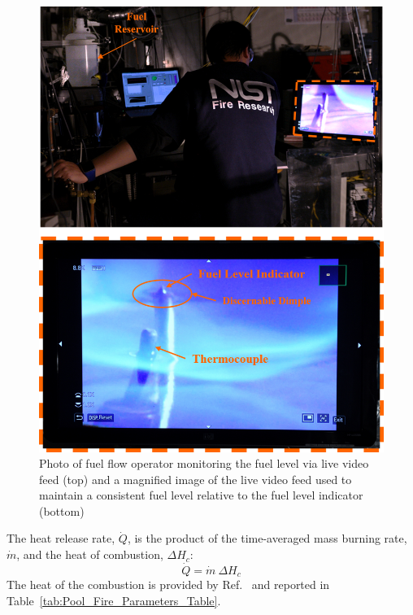 \documentclass[12pt]{article}
\begin{document}
\begin{figure}[h!]
	\centering
\includegraphics[width=14.0cm,keepaspectratio]{Monitoring_Fuel_Level_A.png}
	\caption[Photographs of the fuel monitoring process]{Photo of fuel flow operator monitoring the fuel level via live video feed (top) and a magnified image of the live video feed used to maintain a consistent fuel level relative to the fuel level indicator (bottom)}
	\label{fig:Fuel_Level}
\end{figure}

The heat release rate, $\dot{Q}$, is the product of the time-averaged mass burning rate, $\dot{m}$, and the heat of combustion, $\Delta H_{c}$:
\begin{equation}\label{eq:Heat_release_rate}
\dot{Q}= \dot{m}~\Delta H_{c}
\end{equation}
The heat of the combustion is provided by Ref.~\cite{Dippr} and reported in Table~\ref{tab:Pool_Fire_Parameters_Table}. 
\end{document}
